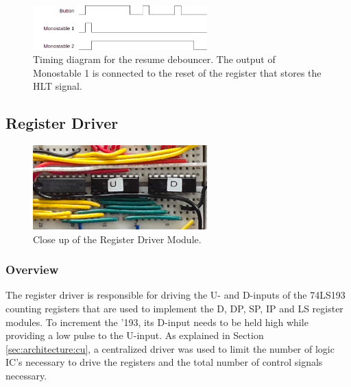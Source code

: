 \begin{figure}[H]
  \centering
  \includegraphics[width=0.6\textwidth]{img/resumedebounce}
  \caption{Timing diagram for the resume debouncer. The output of Monostable 1 is connected to the reset of the register that stores the HLT signal.}
  \label{fig:resumedebounce}
\end{figure}



\newpage\subsection{Register Driver} \label{sec:implementation:registerdriver}
\begin{figure}[H]
  \centering
  \includegraphics[width=0.6\textwidth]{img/registerdrivercloseup}
  \caption{Close up of the Register Driver Module.}
  \label{fig:registerdrivercloseup}
\end{figure}

\subsubsection{Overview}
The register driver is responsible for driving the U- and D-inputs of the 74LS193 counting registers that are used to implement the D, DP, SP, IP and LS register modules. To increment the '193, its D-input needs to be held high while providing a low pulse to the U-input. As explained in Section \ref{sec:architecture:cu}, a centralized driver was used to limit the number of logic IC's necessary to drive the registers and the total number of control signals necessary.


